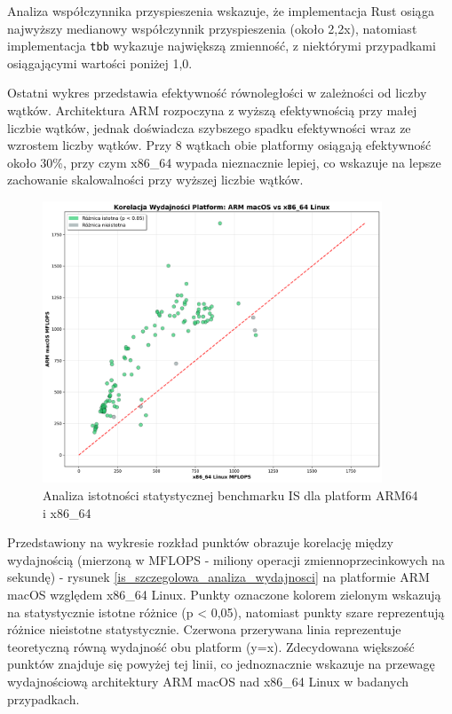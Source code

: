 Analiza współczynnika przyspieszenia wskazuje, że implementacja Rust osiąga najwyższy medianowy współczynnik przyspieszenia (około 2,2x), natomiast implementacja \texttt{tbb} wykazuje największą zmienność, z niektórymi przypadkami osiągającymi wartości poniżej 1,0.

Ostatni wykres przedstawia efektywność równoległości w zależności od liczby wątków. Architektura ARM rozpoczyna z wyższą efektywnością przy małej liczbie wątków, jednak doświadcza szybszego spadku efektywności wraz ze wzrostem liczby wątków. Przy 8 wątkach obie platformy osiągają efektywność około 30\%, przy czym x86\_64 wypada nieznacznie lepiej, co wskazuje na lepsze zachowanie skalowalności przy wyższej liczbie wątków.
\begin{figure}[H]
    \centering
    \includegraphics[width=0.9\textwidth]{analiza/images/parallel/is/compare/is_analiza_istotnosci_statystycznej.png}
    \caption{Analiza istotności statystycznej benchmarku IS dla platform ARM64 i x86\_64}
    \label{is_analiza_istotnosci_statystycznej}
\end{figure}
Przedstawiony na wykresie rozkład punktów obrazuje korelację między wydajnością (mierzoną w MFLOPS - miliony operacji zmiennoprzecinkowych na sekundę) - rysunek \ref{is_szczegolowa_analiza_wydajnosci} na platformie ARM macOS względem x86\_64 Linux. Punkty oznaczone kolorem zielonym wskazują na statystycznie istotne różnice (p < 0,05), natomiast punkty szare reprezentują różnice nieistotne statystycznie. Czerwona przerywana linia reprezentuje teoretyczną równą wydajność obu platform (y=x). Zdecydowana większość punktów znajduje się powyżej tej linii, co jednoznacznie wskazuje na przewagę wydajnościową architektury ARM macOS nad x86\_64 Linux w badanych przypadkach.

